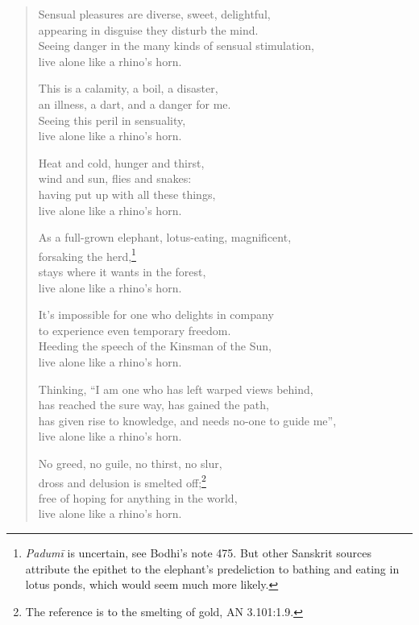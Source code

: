 \documentclass[12pt,openany]{book}%
\begin{document}
\begin{verse}
Sensual pleasures are diverse, sweet, delightful, \\
appearing in disguise they disturb the mind. \\
Seeing danger in the many kinds of sensual stimulation, \\
live alone like a rhino’s horn. 

This is a calamity, a boil, a disaster, \\
an illness, a dart, and a danger for me. \\
Seeing this peril in sensuality, \\
live alone like a rhino’s horn. 

Heat and cold, hunger and thirst, \\
wind and sun, flies and snakes: \\
having put up with all these things, \\
live alone like a rhino’s horn. 

As a full-grown elephant, lotus-eating, magnificent, \\
forsaking the herd,\footnote{\textit{\textsanskrit{Padumī}} is uncertain, see Bodhi’s note 475. But other Sanskrit sources attribute the epithet to the elephant’s predeliction to bathing and eating in lotus ponds, which would seem much more likely. } \\
stays where it wants in the forest, \\
live alone like a rhino’s horn. 

It’s impossible for one who delights in company \\
to experience even temporary freedom. \\
Heeding the speech of the Kinsman of the Sun, \\
live alone like a rhino’s horn. 

Thinking, “I am one who has left warped views behind, \\
has reached the sure way, has gained the path, \\
has given rise to knowledge, and needs no-one to guide me”, \\
live alone like a rhino’s horn. 

No greed, no guile, no thirst, no slur, \\
dross and delusion is smelted off;\footnote{The reference is to the smelting of gold, AN 3.101:1.9. } \\
free of hoping for anything in the world, \\
live alone like a rhino’s horn. 


\end{verse}
\end{document}
